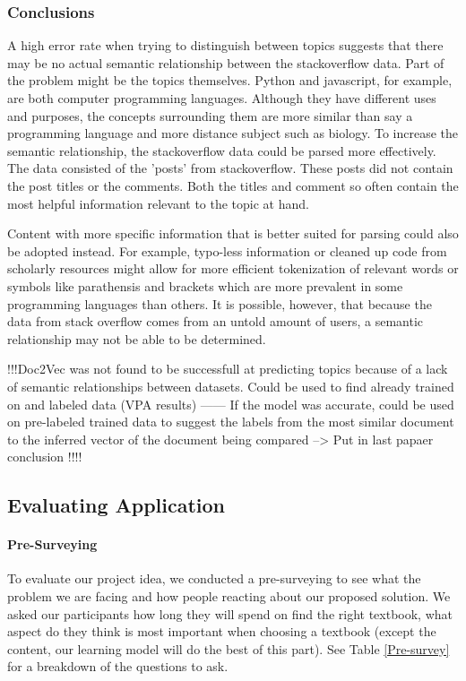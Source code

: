 \subsubsection{Conclusions}
A high error rate when trying to distinguish between topics suggests that there may be no actual semantic relationship between the stackoverflow data. Part of the problem might be the topics themselves. Python and javascript, for example, are both computer programming languages. Although they have different uses and purposes, the concepts surrounding them are more similar than say a programming language and more distance subject such as biology. To increase the semantic relationship, the stackoverflow data could be parsed more effectively. The data consisted of the 'posts' from stackoverflow. These posts did not contain the post titles or the comments. Both the titles and comment so often contain the most helpful information relevant to the topic at hand. 

Content with more specific information that is better suited for parsing could also be adopted instead. For example, typo-less information or cleaned up code from scholarly resources might allow for more efficient tokenization of relevant words or symbols like parathensis and brackets which are more prevalent in some programming languages than others. It is possible, however, that because the data from stack overflow comes from an untold amount of users, a semantic relationship may not be able to be determined. 

!!!Doc2Vec was not found to be successfull at predicting topics because of a lack of semantic relationships between datasets. Could be used to find already trained on and labeled data (VPA results) ------ If the model was accurate, could be used on pre-labeled trained data to suggest the labels from the most similar document to the inferred vector of the document being compared  --> Put in last papaer conclusion !!!!

\subsection{Evaluating Application}
\paragraph{Pre-Surveying}
To evaluate our project idea, we conducted a pre-surveying to see what the problem we are facing and how people reacting about our proposed solution. We asked our participants how long they will spend on find the right textbook, what aspect do they think is most important when choosing a textbook (except the content, our learning model will do the best of this part). See Table \ref{Pre-survey} for a breakdown of the questions to ask.

